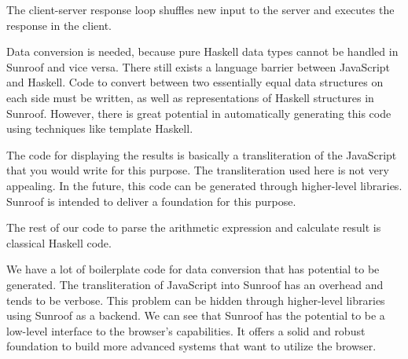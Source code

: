 The client-server response loop shuffles new input to the server 
and executes the response in the client.

Data conversion is needed, because pure Haskell data types
cannot be handled in Sunroof and vice versa. There still
exists a language barrier between JavaScript and Haskell. 
Code to convert between two essentially equal data structures on 
each side must be written, as well as representations of Haskell 
structures in Sunroof. However, there is great potential in automatically 
generating this code using techniques like template Haskell.

The code for displaying the results is basically a 
transliteration of the JavaScript that you would write for this 
purpose.
The transliteration used here is not very appealing. 
In the future, this code can be generated through higher-level 
libraries. Sunroof is intended to deliver a foundation for
this purpose.

The rest of our code to parse the arithmetic expression and calculate 
result is classical Haskell code. 

We have a lot of boilerplate code for data conversion
that has potential to be generated.
The transliteration of JavaScript into Sunroof has an overhead and
tends to be verbose. This problem can be hidden through 
higher-level libraries using Sunroof as a backend. 
We can see that Sunroof has the potential to be a low-level interface
to the browser's capabilities. It offers a solid and robust foundation to build
more advanced systems that want to utilize the browser.

